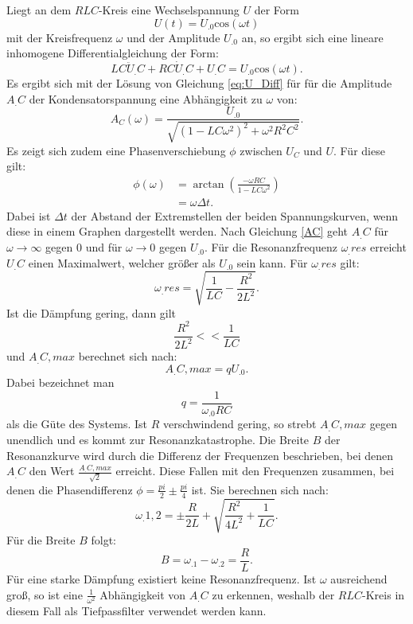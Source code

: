 Liegt an dem $RLC$-Kreis eine Wechselspannung $U$ der Form 
\[
U(t)=U_.0\mathrm{cos}(\omega t)
\]
mit der Kreisfrequenz $\omega$ und der Amplitude $U_.0$ an, so ergibt sich eine lineare inhomogene Differentialgleichung der Form:
\begin{equation}
LC\ddot{U}_.C + RC\dot{U}_.C + U_.C = U_.0\mathrm{cos}(\omega t)\text{.}\label{eq:U_Diff}
\end{equation}
Es ergibt sich mit der Lösung von Gleichung \eqref{eq:U_Diff} für für die Amplitude $A_.C$ der Kondensatorspannung eine Abhängigkeit zu $\omega$ von:
\begin{equation}
A_C(\omega) = \frac{U_.0}{\sqrt{(1-LC\omega^2)^2 + \omega^2R^2C^2}}\text{.}\label{AC}
\end{equation}
Es zeigt sich zudem eine Phasenverschiebung $\phi$ zwischen $U_C$ und $U$. Für diese gilt:
\begin{align}
\phi(\omega) 	&= \arctan\left( \frac{-\omega RC}{1-LC \omega^2}\right)\\
				&= \omega \Delta t\text{.}\label{phi}
\end{align}
Dabei ist $\Delta t$ der Abstand der Extremstellen der beiden Spannungskurven, wenn diese in einem Graphen dargestellt werden.\newline
Nach Gleichung \eqref{AC} geht $A_.C$ für $\omega \to \infty$ gegen $0$ und für $\omega \to 0$ gegen $U_.0$.
Für die Resonanzfrequenz $\omega_.{res}$ erreicht $U_.C$ einen Maximalwert, welcher größer als $U_.0$ sein kann. Für $\omega_.{res}$ gilt:
\begin{equation}
\omega_.{res} = \sqrt{\frac{1}{LC}-\frac{R^2}{2L^2}}\text{.}
\end{equation}
Ist die Dämpfung gering, dann gilt
\[
\frac{R^2}{2L^2}<<\frac{1}{LC}
\]
und $A_.{C,max}$ berechnet sich nach:
\begin{equation}
A_.{C,max} = qU_.0\text{.}
\end{equation}
Dabei bezeichnet man 
\begin{equation}
q = \frac{1}{\omega_.0RC}
\end{equation}
als die Güte des Systems. Ist $R$ verschwindend gering, so strebt $A_.{C,max}$ gegen unendlich und es kommt zur Resonanzkatastrophe.\newline
Die Breite $B$ der Resonanzkurve wird durch die Differenz der Frequenzen beschrieben, bei denen $A_.C$ den Wert $\frac{A_.{C,max}}{\sqrt{2}}$ erreicht. Diese Fallen mit den Frequenzen zusammen, bei denen die Phasendifferenz $\phi=\frac{pi}{2}\pm\frac{pi}{4}$ ist. Sie berechnen sich nach:
\begin{equation*}
\omega_.{1,2} = \pm \frac{R}{2L} + \sqrt{\frac{R^2}{4L^2} + \frac{1}{LC}}\text{.}
\end{equation*}
Für die Breite $B$ folgt:
\begin{equation}
B = \omega_.1-\omega_.2 = \frac{R}{L}\text{.}
\end{equation}
Für eine starke Dämpfung existiert keine Resonanzfrequenz. Ist $\omega$ ausreichend groß, so ist eine $\frac{1}{\omega^2}$ Abhängigkeit von $A_.C$ zu erkennen, weshalb der $RLC$-Kreis in diesem Fall als Tiefpassfilter verwendet werden kann. 
